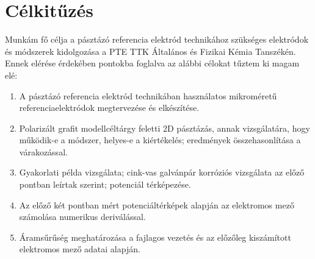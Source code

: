 \chapter{Célkitűzés} \label{celkituzes}
\pagestyle{headings}

Munkám fő célja a pásztázó referencia elektród technikához szükséges elektródok és módszerek kidolgozása a PTE TTK Általános és Fizikai Kémia Tanszékén. Ennek elérése érdekében pontokba foglalva az alábbi célokat tűztem ki magam elé:

\begin{enumerate}
\item  A pásztázó referencia elektród technikában használatos mikroméretű referenciaelektródok megtervezése és elkészítése.
\item  Polarizált grafit modellcéltárgy feletti 2D pásztázás, annak vizsgálatára, hogy működik-e a módszer, helyes-e a kiértékelés; eredmények összehasonlítása a várakozással.
\item  Gyakorlati példa vizsgálata; cink-vas galvánpár korróziós vizsgálata az előző pontban leírtak szerint; potenciál térképezése.
\item  Az előző két pontban mért potenciáltérképek alapján az elektromos mező számolása numerikus deriválással.
\item  Áramsűrűség meghatározása a fajlagos vezetés és az előzőleg kiszámított elektromos mező adatai alapján.
\end{enumerate}


